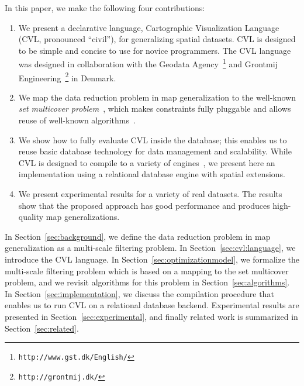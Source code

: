 In this paper, we make the following four contributions:
\begin{enumerate}
\item We present a declarative language, Cartographic Visualization Language (CVL, pronounced ``civil''), for generalizing spatial datasets. CVL is designed to be simple and concise to use for novice programmers. The CVL language was designed in collaboration with the Geodata Agency~\footnote{\texttt{http://www.gst.dk/English/}} and Grontmij Engineering~\footnote{\texttt{http://grontmij.dk/}} in Denmark.

\item We map the data reduction problem in map generalization to the well-known \emph{set multicover problem}~\cite{rajagopalan1998primal}, which makes constraints fully pluggable and allows reuse of well-known algorithms~\cite{rajagopalan1998primal,vazirani2001approximation}.

\item We show how to fully evaluate CVL inside the database; this enables us to reuse basic database technology for data management and scalability. While CVL is designed to compile to a variety of engines~\cite{Stonebraker:2010:PDBMSvsMapReduce}, we present here an implementation using a relational database engine with spatial extensions.

\item We present experimental results for a variety of real datasets. The results show that the proposed approach has good performance and produces high-quality map generalizations.
\end{enumerate}

In Section~\ref{sec:background}, we define the data reduction problem in map generalization as a multi-scale filtering problem. In Section~\ref{sec:cvl:language}, we introduce the CVL language. In Section~\ref{sec:optimizationmodel}, we formalize the multi-scale filtering problem which is based on a mapping to the set multicover problem, and we revisit algorithms for this problem in Section~\ref{sec:algorithms}. In Section~\ref{sec:implementation}, we discuss the compilation procedure that enables us to run CVL on a relational database backend. Experimental results are presented in Section~\ref{sec:experimental}, and finally related work is summarized in Section~\ref{sec:related}.
